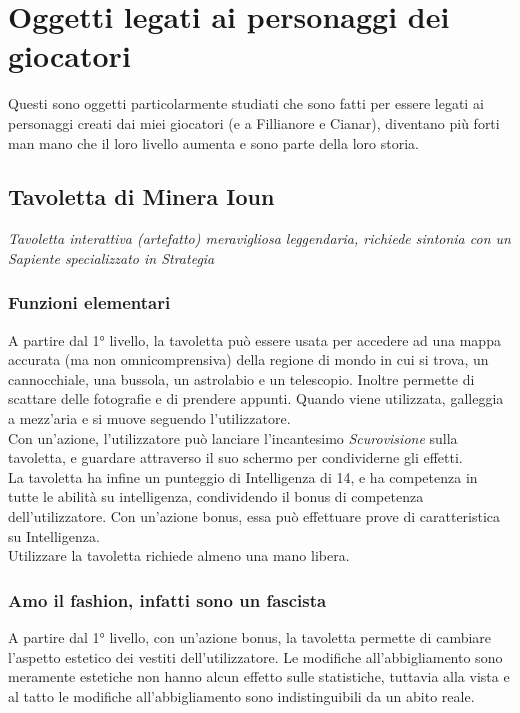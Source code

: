 
\section{Oggetti legati ai personaggi dei giocatori}

Questi sono oggetti particolarmente studiati che sono fatti per essere legati ai personaggi creati dai miei giocatori (e a Fillianore e Cianar), diventano più forti man mano che il loro livello aumenta e sono parte della loro storia.

\subsection{Tavoletta di Minera Ioun}
\textit{Tavoletta interattiva (artefatto) meravigliosa leggendaria, richiede sintonia con un Sapiente specializzato in Strategia}

\subsubsection{Funzioni elementari}
A partire dal 1° livello, la tavoletta può essere usata per accedere ad una mappa accurata (ma non omnicomprensiva) della regione di mondo in cui si trova, un cannocchiale, una bussola, un astrolabio e un telescopio. Inoltre permette di scattare delle fotografie e di prendere appunti. Quando viene utilizzata, galleggia a mezz'aria e si muove seguendo l'utilizzatore.\\ Con un'azione, l'utilizzatore può lanciare l'incantesimo \textit{Scurovisione} sulla tavoletta, e guardare attraverso il suo schermo per condividerne gli effetti.\\ La tavoletta ha infine un punteggio di Intelligenza di 14, e ha competenza in tutte le abilità su intelligenza, condividendo il bonus di competenza dell'utilizzatore. Con un'azione bonus, essa può effettuare prove di caratteristica su Intelligenza.\\ Utilizzare la tavoletta richiede almeno una mano libera.

\subsubsection{Amo il fashion, infatti sono un fascista}
A partire dal 1° livello, con un'azione bonus, la tavoletta permette di cambiare l'aspetto estetico dei vestiti dell'utilizzatore. Le modifiche all'abbigliamento sono meramente estetiche non hanno alcun effetto sulle statistiche, tuttavia alla vista e al tatto le modifiche all'abbigliamento sono indistinguibili da un abito reale.

